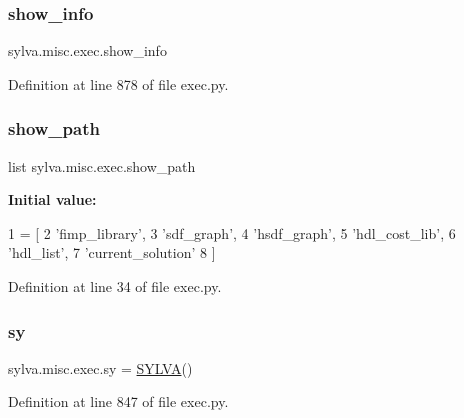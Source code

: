 \subsubsection{\texorpdfstring{show\+\_\+info}{show\_info}}
{\footnotesize\ttfamily sylva.\+misc.\+exec.\+show\+\_\+info}



Definition at line 878 of file exec.\+py.

\mbox{\label{namespacesylva_1_1misc_1_1exec_a89f5942ad18e46f54d1974b4a1d4838f}} 
\subsubsection{\texorpdfstring{show\+\_\+path}{show\_path}}
{\footnotesize\ttfamily list sylva.\+misc.\+exec.\+show\+\_\+path}

{\bfseries Initial value\+:}
\begin{DoxyCode}
1 =  [
2   \textcolor{stringliteral}{'fimp\_library'},
3   \textcolor{stringliteral}{'sdf\_graph'},
4   \textcolor{stringliteral}{'hsdf\_graph'},
5   \textcolor{stringliteral}{'hdl\_cost\_lib'},
6   \textcolor{stringliteral}{'hdl\_list'},
7   \textcolor{stringliteral}{'current\_solution'}
8 ]
\end{DoxyCode}


Definition at line 34 of file exec.\+py.

\mbox{\label{namespacesylva_1_1misc_1_1exec_a7e1290d4d20b3d0e4d61c95571edda24}} 
\subsubsection{\texorpdfstring{sy}{sy}}
{\footnotesize\ttfamily sylva.\+misc.\+exec.\+sy = \hyperlink{classsylva_1_1misc_1_1exec_1_1_s_y_l_v_a}{S\+Y\+L\+VA}()}



Definition at line 847 of file exec.\+py.

\mbox{\label{namespacesylva_1_1misc_1_1exec_ac117b58661906ce710d1cbe733234572}} 
